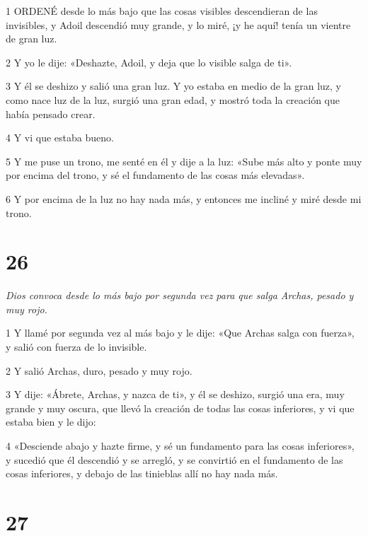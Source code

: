 \par 1 ORDENÉ desde lo más bajo que las cosas visibles descendieran de las invisibles, y Adoil descendió muy grande, y lo miré, ¡y he aquí! tenía un vientre de gran luz.

\par 2 Y yo le dije: «Deshazte, Adoil, y deja que lo visible salga de ti».

\par 3 Y él se deshizo y salió una gran luz. Y yo estaba en medio de la gran luz, y como nace luz de la luz, surgió una gran edad, y mostró toda la creación que había pensado crear.

\par 4 Y vi que estaba bueno.

\par 5 Y me puse un trono, me senté en él y dije a la luz: «Sube más alto y ponte muy por encima del trono, y sé el fundamento de las cosas más elevadas».

\par 6 Y por encima de la luz no hay nada más, y entonces me incliné y miré desde mi trono.

\chapter{26}

\par \textit{Dios convoca desde lo más bajo por segunda vez para que salga Archas, pesado y muy rojo.}

\par 1 Y llamé por segunda vez al más bajo y le dije: «Que Archas salga con fuerza», y salió con fuerza de lo invisible.

\par 2 Y salió Archas, duro, pesado y muy rojo.

\par 3 Y dije: «Ábrete, Archas, y nazca de ti», y él se deshizo, surgió una era, muy grande y muy oscura, que llevó la creación de todas las cosas inferiores, y vi que estaba bien y le dijo:

\par 4 «Desciende abajo y hazte firme, y sé un fundamento para las cosas inferiores», y sucedió que él descendió y se arregló, y se convirtió en el fundamento de las cosas inferiores, y debajo de las tinieblas allí no hay nada más.



\chapter{27}

